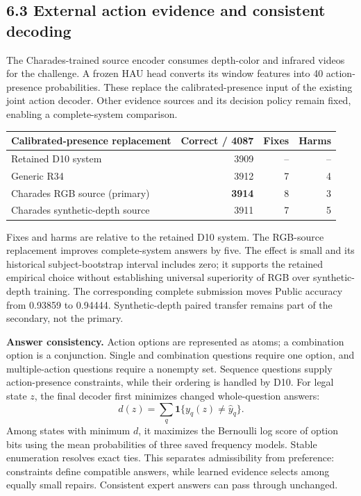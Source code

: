 \documentclass[12pt,a4paper]{article}
\begin{document}
\subsection*{6.3 External action evidence and consistent decoding}
The Charades-trained source encoder consumes depth-color and infrared videos for the challenge. A frozen HAU head converts its window features into 40 action-presence probabilities. These replace the calibrated-presence input of the existing joint action decoder. Other evidence sources and its decision policy remain fixed, enabling a complete-system comparison.

\begin{tabularx}{\linewidth}{@{}Yrrr@{}}
\toprule
Calibrated-presence replacement & Correct / 4087 & Fixes & Harms\\
\midrule
Retained D10 system & 3909 & -- & --\\
Generic R34 & 3912 & 7 & 4\\
Charades RGB source (primary) & \textbf{3914} & 8 & 3\\
Charades synthetic-depth source & 3911 & 7 & 5\\
\bottomrule
\end{tabularx}

Fixes and harms are relative to the retained D10 system. The RGB-source replacement improves complete-system answers by five. The effect is small and its historical subject-bootstrap interval includes zero; it supports the retained empirical choice without establishing universal superiority of RGB over synthetic-depth training. The corresponding complete submission moves Public accuracy from 0.93859 to 0.94444. Synthetic-depth paired transfer remains part of the secondary, not the primary.

\textbf{Answer consistency.} Action options are represented as atoms; a combination option is a conjunction. Single and combination questions require one option, and multiple-action questions require a nonempty set. Sequence questions supply action-presence constraints, while their ordering is handled by D10. For legal state $z$, the final decoder first minimizes changed whole-question answers:
\[
d(z)=\sum_q\mathbf{1}\{y_q(z)\neq\widehat y_q\}.
\]
Among states with minimum $d$, it maximizes the Bernoulli log score of option bits using the mean probabilities of three saved frequency models. Stable enumeration resolves exact ties. This separates admissibility from preference: constraints define compatible answers, while learned evidence selects among equally small repairs. Consistent expert answers can pass through unchanged.
\end{document}
